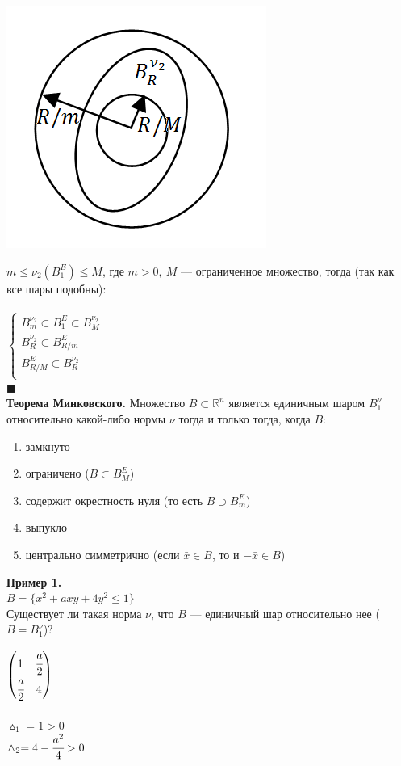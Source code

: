\documentclass[12pt]{article}
\theoremstyle{definition}
\numberwithin{equation}{section}
\begin{document}
\begin{center}
\includegraphics[scale=0.65]{l5_8.png}\end{center}
$m \leqslant \nu_2(B_1^E) \leqslant M$, где $m > 0, ~M$ --- ограниченное множество, тогда (так как все шары подобны):\\ \\
$
\left\{  
\begin{array}{lcl}  
    B_m^{\nu_2} \subset B_1^E \subset B_M^{\nu_2} \\  
    B_R^{\nu_2} \subset B_{R/m}^E \\
    B_{R/M}^E \subset B_R^{\nu_2}\\
\end{array}   
\right.  
$
\\
$\blacksquare$
\\ 
\textbf{Теорема Минковского.}
Множество $B \subset \mathbb{R}^n$ является единичным шаром $B_1^{\nu}$ относительно какой-либо нормы $\nu$ тогда и только тогда, когда $B$:\begin{enumerate}
\item замкнуто
\item ограничено ($B \subset B_M^E$)
\item содержит окрестность нуля (то есть $B \supset B_m^E$)
\item выпукло
\item центрально симметрично (если $\bar x \in B$, то и $-\bar x \in B$)
\end{enumerate}
\textbf{Пример 1.}\\
$B = \{x^2+axy+4y^2 \leqslant 1\}$\\
Существует ли такая норма $\nu$, что $B$ --- единичный шар относительно нее ($B = B_1^{\nu}$)?\\
\begin{center}
$
\begin{pmatrix}
1 & \cfrac{a}{2}\\
\cfrac{a}{2} & 4
\end{pmatrix}
$
\\ ~\\
$\vartriangle_1 = 1 > 0$\\
$\vartriangle_2 = 4 - \cfrac{a^2}{4} > 0$\end{center}
\end{document}
